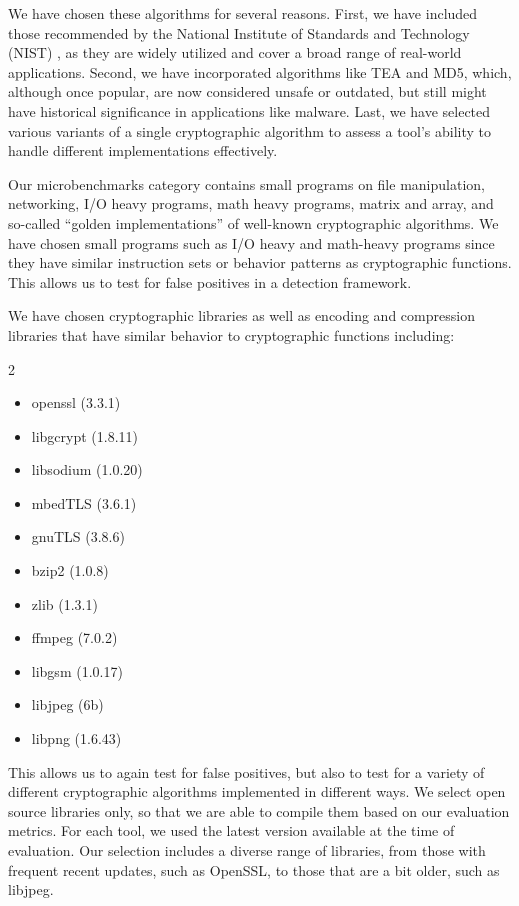 We have chosen these algorithms for several reasons. First, we have included those recommended by the National Institute of Standards and Technology (NIST) \cite{nist}, as they are widely utilized and cover a broad range of real-world applications. Second, we have incorporated algorithms like TEA and MD5, which, although once popular, are now considered unsafe or outdated, but still might have historical significance in applications like malware. Last, we have selected various variants of a single cryptographic algorithm to assess a tool's ability to handle different implementations effectively.

 Our microbenchmarks category contains small programs on file
manipulation, networking, I/O heavy programs, math heavy programs, matrix and array, and so-called ``golden
implementations'' of well-known cryptographic algorithms. We have chosen small
programs such as I/O heavy and math-heavy programs since they have similar
instruction sets or behavior patterns as cryptographic functions.  This allows us to test for false positives in a detection framework.

 We have chosen cryptographic libraries as well as encoding and
compression libraries that have similar behavior to cryptographic
functions including:
\vspace*{-10pt}
\begin{multicols}{2}
\begin{itemize}[noitemsep,topsep=0pt]
\item openssl (3.3.1)
\item libgcrypt (1.8.11)
\item libsodium (1.0.20)
\item mbedTLS (3.6.1)
\item gnuTLS (3.8.6)
\item bzip2 (1.0.8)
\item zlib (1.3.1)
\item ffmpeg (7.0.2)
\item libgsm (1.0.17)
\item libjpeg (6b)
\item libpng (1.6.43)
\end{itemize}
\end{multicols}

This allows us to again test for false positives, but also to test for a variety of different cryptographic algorithms implemented in different ways.
We select open source libraries only, so that we are able to compile them based on our evaluation metrics. For each tool, we used the latest version available at the time of evaluation. Our selection includes a diverse range of libraries, from those with frequent recent updates, such as OpenSSL, to those that are a bit older, such as libjpeg.


